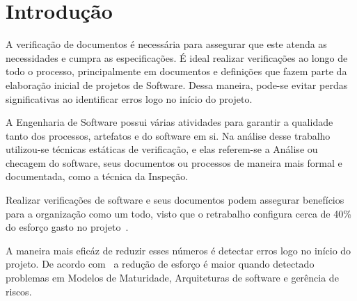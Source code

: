 \chapter{Introdução}

A verificação de documentos é necessária para assegurar que este atenda as necessidades e cumpra as especificações. É ideal realizar verificações ao longo de todo o processo, principalmente em documentos e definições que fazem parte da elaboração inicial de projetos de Software. Dessa maneira, pode-se evitar perdas significativas ao identificar erros logo no início do projeto.

A Engenharia de Software possui várias atividades para garantir a qualidade tanto dos processos, artefatos e do software em si. Na análise desse trabalho utilizou-se técnicas estáticas de verificação, e elas referem-se a Análise ou checagem do software, seus documentos ou processos de maneira mais formal e documentada, como a técnica da Inspeção.

Realizar verificações de software e seus documentos podem assegurar benefícios para a organização como um todo, visto que o retrabalho configura cerca de 40\% do esforço gasto no projeto~\cite{}. 

A maneira mais eficáz de reduzir esses números é detectar erros logo no início do projeto. De acordo com~\cite{} a redução de esforço é maior quando detectado problemas em Modelos de Maturidade, Arquiteturas de software e gerência de riscos. 

